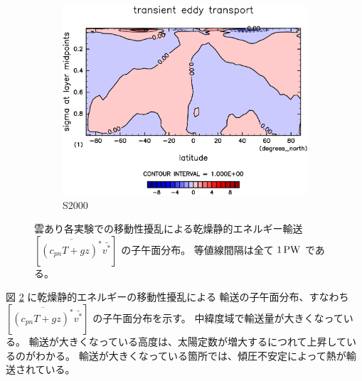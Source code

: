 \documentclass[body]{subfiles}
\begin{document}
\begin{figure}[t]
\begin{subfigure}{.4\textwidth}
		\centering
		\includegraphics[width=\textwidth]{S2000/MeriHeatTransTest@dryStatEn_TE,time=7300:7665-crop-rotate.pdf}
		\caption{S2000}\label{乾燥静的エネルギー移動性擾乱S2000}
	\end{subfigure}
	\caption[雲あり各実験での移動性擾乱に依る乾燥静的エネルギー輸送の子午面分布]{
		雲あり各実験での移動性擾乱による乾燥静的エネルギー輸送 \([\overline{(c_{pn}T+gz)^*}\bar{v^*}]\) の子午面分布。
		等値線間隔は全て \(1\hmu{PW}\) である。
	}\label{乾燥静的エネルギー移動性擾乱}
\end{figure}

図 \ref{乾燥静的エネルギー移動性擾乱} に乾燥静的エネルギーの移動性擾乱による
輸送の子午面分布、すなわち \([\overline{(c_{pn}T+gz)^*}\bar{v^*}]\) の子午面分布を示す。
中緯度域で輸送量が大きくなっている。
輸送が大きくなっている高度は、太陽定数が増大するにつれて上昇しているのがわかる。
輸送が大きくなっている箇所では、傾圧不安定によって熱が輸送されている。
\end{document}
